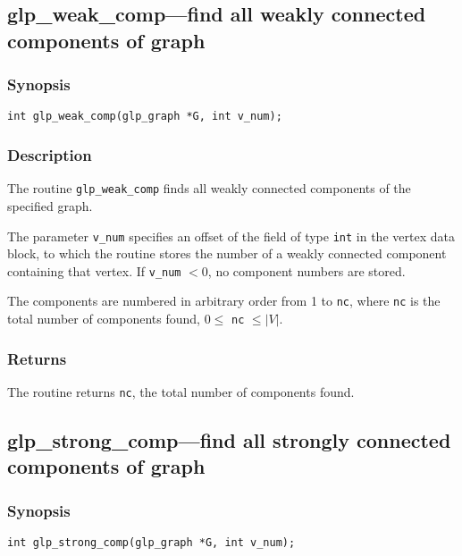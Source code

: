 \documentclass[dvipdfm,11pt]{report}
\begin{document}
\subsection{glp\_weak\_comp---find all weakly connected components of
graph}

\subsubsection*{Synopsis}

\begin{verbatim}
int glp_weak_comp(glp_graph *G, int v_num);
\end{verbatim}

\subsubsection*{Description}

The routine \verb|glp_weak_comp| finds all weakly connected components
of the specified graph.

The parameter \verb|v_num| specifies an offset of the field of type
\verb|int| in the vertex data block, to which the routine stores the
number of a weakly connected component containing that vertex. If
\verb|v_num| $<0$, no component numbers are stored.

The components are numbered in arbitrary order from 1 to \verb|nc|,
where \verb|nc| is the total number of components found,
$0\leq$ \verb|nc| $\leq|V|$.

\subsubsection*{Returns}

The routine returns \verb|nc|, the total number of components found.

\subsection{glp\_strong\_comp---find all strongly connected components
of graph}

\subsubsection*{Synopsis}

\begin{verbatim}
int glp_strong_comp(glp_graph *G, int v_num);
\end{verbatim}
\end{document}

